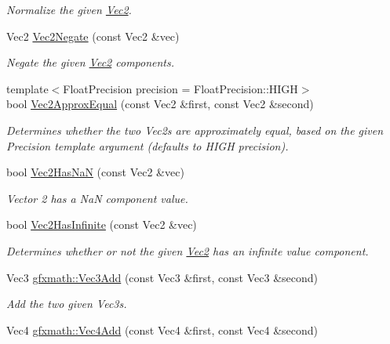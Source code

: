 \begin{DoxyCompactItemize}
\begin{DoxyCompactList}\small\item\em Normalize the given \hyperlink{classgfxmath_1_1_vec2}{Vec2}. \end{DoxyCompactList}\item 
Vec2 \hyperlink{group___s_i_s_d_vec_math_ga55959c707ef1b444eb2d71009a201aa2}{Vec2\+Negate} (const Vec2 \&vec)
\begin{DoxyCompactList}\small\item\em Negate the given \hyperlink{classgfxmath_1_1_vec2}{Vec2} components. \end{DoxyCompactList}\item 
{\footnotesize template$<$Float\+Precision precision = Float\+Precision\+::\+H\+I\+G\+H$>$ }\\bool \hyperlink{group___s_i_s_d_vec_math_gae2e5df24e56917013fefa17579bb8749}{Vec2\+Approx\+Equal} (const Vec2 \&first, const Vec2 \&second)
\begin{DoxyCompactList}\small\item\em Determines whether the two Vec2s are approximately equal, based on the given Precision template argument (defaults to H\+I\+G\+H precision). \end{DoxyCompactList}\item 
bool \hyperlink{group___s_i_s_d_vec_math_ga7b340b1e4dd88d99aba27f41cd0c1d17}{Vec2\+Has\+Na\+N} (const Vec2 \&vec)
\begin{DoxyCompactList}\small\item\em Vector 2 has a Na\+N component value. \end{DoxyCompactList}\item 
bool \hyperlink{group___s_i_s_d_vec_math_ga6eb96a6532361189c7cacdbd9ae95c90}{Vec2\+Has\+Infinite} (const Vec2 \&vec)
\begin{DoxyCompactList}\small\item\em Determines whether or not the given \hyperlink{classgfxmath_1_1_vec2}{Vec2} has an infinite value component. \end{DoxyCompactList}\item 
Vec3 \hyperlink{group___s_i_s_d_vec_math_gac3979900225f137a1486a4491d0fb6d8}{gfxmath\+::\+Vec3\+Add} (const Vec3 \&first, const Vec3 \&second)
\begin{DoxyCompactList}\small\item\em Add the two given Vec3s. \end{DoxyCompactList}\item 
Vec4 \hyperlink{group___s_i_s_d_vec_math_ga8812efd4565ada77e6dab63828ad715b}{gfxmath\+::\+Vec4\+Add} (const Vec4 \&first, const Vec4 \&second)

\end{DoxyCompactItemize}
